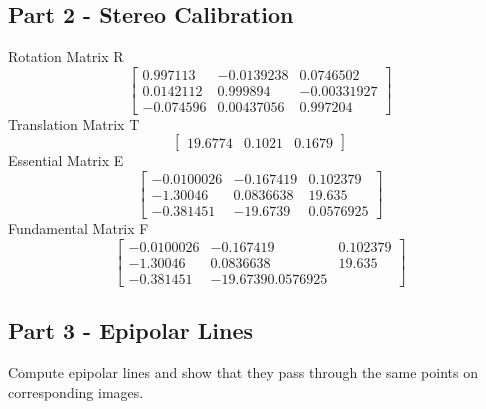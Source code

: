 \documentclass[12pt,a4paper,final]{article}
\begin{document}
\subsection*{Part 2 - Stereo Calibration}
Rotation Matrix R
\begin{equation*}
\begin{bmatrix}
0.997113 &-0.0139238 &0.0746502 \\0.0142112 &0.999894 &-0.00331927 \\-0.074596 &0.00437056 &0.997204
\end{bmatrix}
\end{equation*}
Translation Matrix T
\begin{equation*}
\begin{bmatrix}
19.6774 & 0.1021 & 0.1679
\end{bmatrix}
\end{equation*}
Essential Matrix E
\begin{equation*}
\begin{bmatrix}
-0.0100026& -0.167419 &0.102379 \\-1.30046 &0.0836638 &19.635 \\-0.381451 &-19.6739 &0.0576925
\end{bmatrix}
\end{equation*}
Fundamental Matrix F
\begin{equation*}
\begin{bmatrix}
-0.0100026 &-0.167419 &0.102379 \\-1.30046 &0.0836638 &19.635 \\-0.381451 &-19.6739 0.0576925
\end{bmatrix}
\end{equation*}

\subsection*{Part 3 - Epipolar Lines}
Compute epipolar lines and show that they pass through the same points on corresponding images.
\end{document}
